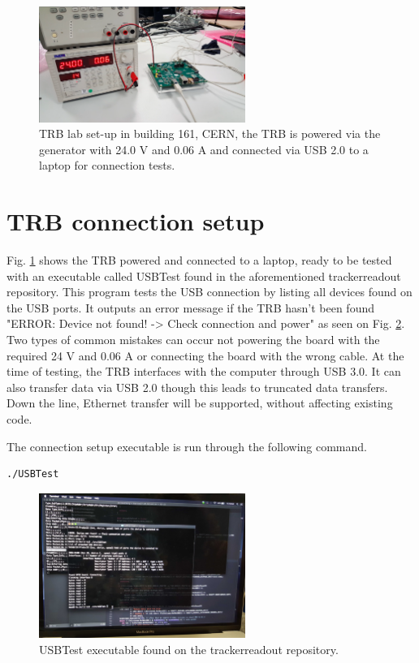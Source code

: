 \begin{figure}[htbp!] 
\centering    
\includegraphics[width=0.6\textwidth]{ChapterDAQ/Figs/Software/TLBwithPowerSupply.png}
\caption[TRB lab set-up]{TRB lab set-up in building 161, CERN, the TRB is powered via the generator with 24.0 V and 0.06 A and connected via USB 2.0 to a laptop for connection tests.}
\label{fig:TRBbdg161Setup}
\end{figure}

\section{TRB connection setup}

Fig. \ref{fig:TRBbdg161Setup} shows the TRB powered and connected to a laptop, ready to be tested with an executable called USBTest found in the aforementioned trackerreadout repository. This program tests the USB connection by listing all devices found on the USB ports. It outputs an error message if the TRB hasn't been found "ERROR: Device not found! -> Check connection and power" as seen on Fig. \ref{fig:USBtest}. Two types of common mistakes can occur not powering the board with the required 24 V and 0.06 A or connecting the board with the wrong cable. At the time of testing, the TRB interfaces with the computer through USB 3.0. It can also transfer data via USB 2.0 though this leads to truncated data transfers. Down the line, Ethernet transfer will be supported, without affecting existing code.

The connection setup executable is run through the following command.
\begin{lstlisting}
./USBTest
\end{lstlisting}

\begin{figure}[htbp!] 
\centering    
\includegraphics[width=0.6\textwidth]{ChapterDAQ/Figs/Software/USBTest.jpg}
\caption[USBTest]{USBTest executable found on the trackerreadout repository.}
\label{fig:USBtest}
\end{figure}

